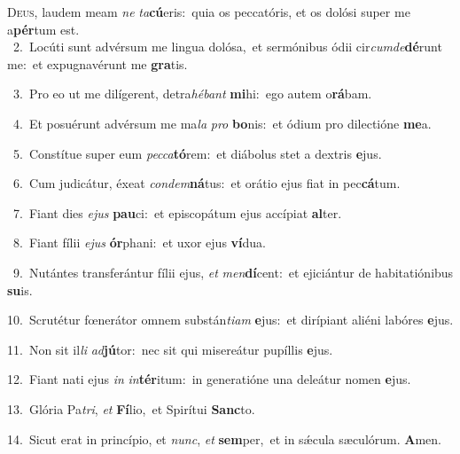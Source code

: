 \lettrine{\initial\textcolor{\initialcolor}{D}}{eus,} laudem meam \textit{ne} \textit{ta}\-\textbf{cú}eris:~\star quia os peccatóris, et os dolósi super me a\-\textbf{pér}\-tum est.\\
{\numbfont\textcolor{\numbcolor}{~2.}}~Locúti sunt advérsum me lingua dolósa,~\dagger et sermónibus ódii cir\-\textit{cum}\-\textit{de}\textbf{dé}runt me:~\star et expugnavérunt me \textbf{gra}\-tis.\par
{\numbfont\textcolor{\numbcolor}{~3.}}~Pro eo ut me dilígerent, detra\-\textit{hé}\-\textit{bant} \textbf{mi}\-hi:~\star ego autem o\-\textbf{rá}\-bam.\par
{\numbfont\textcolor{\numbcolor}{~4.}}~Et posuérunt advérsum me ma\textit{la} \textit{pro} \textbf{bo}\-nis:~\star et ódium pro dilectióne \textbf{me}\-a.\par
{\numbfont\textcolor{\numbcolor}{~5.}}~Constítue super eum \textit{pec}\-\textit{ca}\textbf{tó}rem:~\star et diábolus stet a dextris \textbf{e}\-jus.\par
{\numbfont\textcolor{\numbcolor}{~6.}}~Cum judicátur, éxeat \textit{con}\-\textit{dem}\textbf{ná}tus:~\star et orátio ejus fiat in pec\-\textbf{cá}\-tum.\par
{\numbfont\textcolor{\numbcolor}{~7.}}~Fiant dies \textit{e}\-\textit{jus} \textbf{pau}\-ci:~\star et episcopátum ejus accípiat \textbf{al}\-ter.\par
{\numbfont\textcolor{\numbcolor}{~8.}}~Fiant fílii \textit{e}\-\textit{jus} \textbf{ór}\-phani:~\star et uxor ejus \textbf{ví}\-dua.\par
{\numbfont\textcolor{\numbcolor}{~9.}}~Nutántes transferántur fílii ejus, \textit{et} \textit{men}\-\textbf{dí}cent:~\star et ejiciántur de habitatiónibus \textbf{su}\-is.\par
{\numbfont\textcolor{\numbcolor}{10.}}~Scrutétur fœnerátor omnem substán\-\textit{ti}\-\textit{am} \textbf{e}\-jus:~\star et dirípiant aliéni labóres \textbf{e}\-jus.\par
{\numbfont\textcolor{\numbcolor}{11.}}~Non sit il\textit{li} \textit{ad}\-\textbf{jú}tor:~\star nec sit qui misereátur pupíllis \textbf{e}\-jus.\par
{\numbfont\textcolor{\numbcolor}{12.}}~Fiant nati ejus \textit{in} \textit{in}\-\textbf{tér}itum:~\star in generatióne una deleátur nomen \textbf{e}\-jus.\par
{\numbfont\textcolor{\numbcolor}{13.}}~Glória Pa\-\textit{tri}\-, \textit{et} \textbf{Fí}\-lio,~\star et Spirítui \textbf{Sanc}\-to.\par
{\numbfont\textcolor{\numbcolor}{14.}}~Sicut erat in princípio, et \textit{nunc}\-, \textit{et} \textbf{sem}\-per,~\star et in sǽcula sæculórum. \textbf{A}\-men.\par
